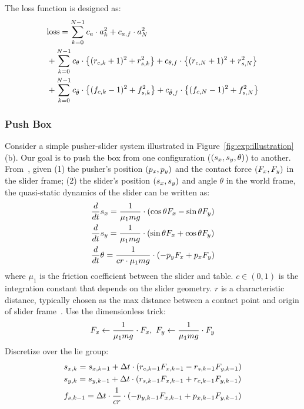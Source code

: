 The loss function is designed as:
\begin{align}
    \label{eq:app:pd:push-bot-loss}
    & \loss = \sum_{k=0}^{N-1} c_a \cdot a_k^2 + c_{a,f} \cdot a_N^2 \nonumber \\
        & + \sum_{k=0}^{N-1} c_\theta \cdot \left\{ 
            (\rc[k] + 1)^2 + \rs[k]^2 
         \right\} + c_{\theta,f} \cdot \left\{ 
            (\rc[N] + 1)^2 + \rs[N]^2 
          \right\} \nonumber \\
        & + \sum_{k=0}^{N-1} c_{\dot{\theta}} \cdot \left\{ 
            (\fc[k] - 1)^2 + \fs[k]^2
          \right\} + c_{\dot{\theta},f} \cdot \left\{ 
            (\fc[N] - 1)^2 + \fs[N]^2
           \right\}
\end{align}

\subsubsection{Push Box}
\label{app:pd:push-box}
Consider a simple pusher-slider system illustrated in Figure~\ref{fig:exp:illustration} (b). Our goal is to push the box from one configuration ($(\sx, \sy, \theta)$) to another.
From~\cite{graesdal2024arxiv-tightconvexrelax-contactrich}, given (1) the pusher's position $(\px, \py)$ and the contact force $(\Fx, \Fy)$ in the slider frame; (2) the slider's position $(\sx, \sy)$ and angle $\theta$ in the world frame, the quasi-static dynamics of the slider can be written as:
\begin{align}
    \label{eq:app:pd:push-box-quasi-static}
    & \frac{d}{dt} \sx = \frac{1}{\mu_1 mg} \cdot (\cos\theta \Fx - \sin\theta \Fy) \\
    & \frac{d}{dt} \sy = \frac{1}{\mu_1 mg} \cdot (\sin\theta \Fx + \cos\theta \Fy) \\
    & \frac{d}{dt} \theta = \frac{1}{c r \cdot \mu_1 mg} \cdot (-\py \Fx + \px \Fy) 
\end{align}
where $\mu_1$ is the friction coefficient between the slider and table. $c \in (0, 1)$ is the integration constant that depends on the slider geometry. $r$ is a characteristic distance, typically chosen as the max distance between a contact point and origin of slider frame~\cite{mason1986ijrr-mechanics-planning-pushing}. Use the dimensionless trick:
\begin{align}
    \Fx \leftarrow \frac{1}{\mu_1 mg} \cdot \Fx, \ \Fy \leftarrow \frac{1}{\mu_1 mg} \cdot \Fy
\end{align}
Discretize over the lie group:
\begin{align}
    & \sx[k] = \sx[k-1] + \dt \cdot (\rc[k-1] \Fx[k-1] - \rs[k-1] \Fy[k-1]) \\
    & \sy[k] = \sy[k-1] + \dt \cdot (\rs[k-1] \Fx[k-1] + \rc[k-1] \Fy[k-1]) \\
    & \fs[k-1] = \dt \cdot \frac{1}{cr} \cdot (-\py[k-1] \Fx[k-1] + \px[k-1] \Fy[k-1]) 
\end{align}
